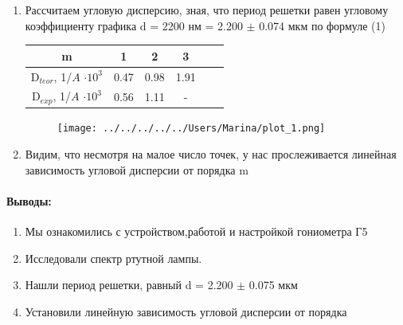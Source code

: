 \documentclass[a4paper,12pt]{article}
\begin{document}
\begin{enumerate}
\begin{figure}[h!]
\end{figure}
\item Рассчитаем угловую дисперсию, зная, что период решетки равен угловому коэффициенту графика d = 2200 нм = 2.200 $\pm$ 0.074 мкм по формуле (1)
\begin{center}
\begin{tabular}{|c|c|c|c|c|c|}
\hline 
m & 1 & 2 & 3 \\ 
\hline 
D$_{teor}$, 1/$A$ $\cdot 10^3$ & 0.47 & 0.98 & 1.91\\ 
\hline 
D$_{exp}$, 1/$A$ $\cdot 10^3$ & 0.56 & 1.11 & - \\ 
\hline
\end{tabular} 
\end{center}
\begin{figure}[h!]
\begin{center}
\texttt{[image: ../../../../../Users/Marina/plot\_1.png]} 
\end{center}
\end{figure}
\item Видим, что несмотря на малое число точек, у нас прослеживается линейная зависимость угловой дисперсии от порядка m
\end{enumerate}
\paragraph{Выводы:}
\begin{enumerate}
\item Мы ознакомились с устройством,работой и настройкой гониометра Г5
\item Исследовали спектр ртутной лампы.
\item Нашли период решетки, равный d = 2.200 $\pm$ 0.075 мкм 
\item Установили линейную зависимость угловой дисперсии от порядка 
\end{enumerate}
\end{document}
